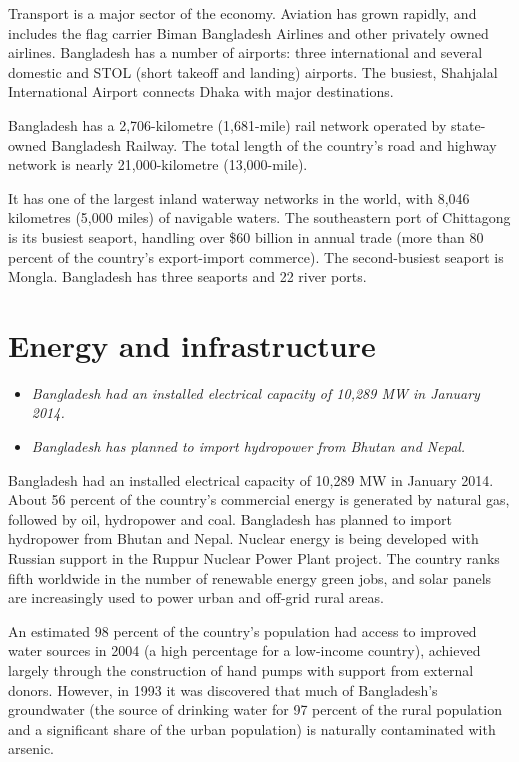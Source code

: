 Transport is a major sector of the economy. Aviation has grown rapidly,
and includes the flag carrier Biman Bangladesh Airlines and other
privately owned airlines. Bangladesh has a number of airports: three
international and several domestic and STOL (short takeoff and landing)
airports. The busiest, Shahjalal International Airport connects Dhaka
with major destinations.

Bangladesh has a 2,706-kilometre (1,681-mile) rail network operated by
state-owned Bangladesh Railway. The total length of the country's road
and highway network is nearly 21,000-kilometre (13,000-mile).

It has one of the largest inland waterway networks in the world, with
8,046 kilometres (5,000 miles) of navigable waters. The southeastern
port of Chittagong is its busiest seaport, handling over \$60 billion in
annual trade (more than 80 percent of the country's export-import
commerce). The second-busiest seaport is Mongla. Bangladesh has three
seaports and 22 river ports.

\section{Energy and infrastructure}\label{energy-and-infrastructure}

\begin{itemize}
\item
  \emph{Bangladesh had an installed electrical capacity of 10,289 MW in
  January 2014.}
\item
  \emph{Bangladesh has planned to import hydropower from Bhutan and
  Nepal.}
\end{itemize}

Bangladesh had an installed electrical capacity of 10,289 MW in January
2014. About 56 percent of the country's commercial energy is generated
by natural gas, followed by oil, hydropower and coal. Bangladesh has
planned to import hydropower from Bhutan and Nepal. Nuclear energy is
being developed with Russian support in the Ruppur Nuclear Power Plant
project. The country ranks fifth worldwide in the number of renewable
energy green jobs, and solar panels are increasingly used to power urban
and off-grid rural areas.

An estimated 98 percent of the country's population had access to
improved water sources in 2004 (a high percentage for a low-income
country), achieved largely through the construction of hand pumps with
support from external donors. However, in 1993 it was discovered that
much of Bangladesh's groundwater (the source of drinking water for 97
percent of the rural population and a significant share of the urban
population) is naturally contaminated with arsenic.

